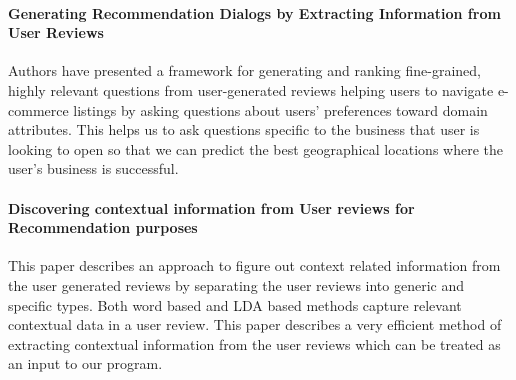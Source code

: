 \documentclass[12pt]{article} %
\begin{document}
\paragraph{Generating Recommendation Dialogs by Extracting Information from User Reviews} 
Authors have presented a framework for generating and ranking fine-grained, highly relevant questions from user-generated reviews helping users to navigate e-commerce listings by asking questions about users' preferences toward domain attributes. This helps us to ask questions specific to the business that user is looking to open so that we can predict the best geographical locations where the user's business is successful.

\paragraph{Discovering contextual information from User reviews for Recommendation purposes}
This paper describes an approach to figure out context related information from the user generated reviews by separating the user reviews into generic and specific types. Both word based and LDA based methods capture relevant contextual data in a user review. This paper describes a very efficient method of extracting contextual information from the user reviews which can be treated as an input to our program.
\end{document}
